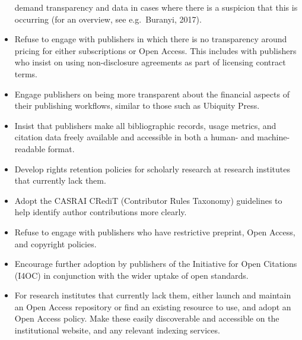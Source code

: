 \documentclass[]{article}
\begin{document}
\begin{itemize}
  demand transparency and data in cases where there is a suspicion that
  this is occurring (for an overview, see e.g.~Buranyi, 2017).
\item
  Refuse to engage with publishers in which there is no transparency
  around pricing for either subscriptions or Open Access. This includes
  with publishers who insist on using non-disclosure agreements as part
  of licensing contract terms.
\item
  Engage publishers on being more transparent about the financial
  aspects of their publishing workflows, similar to those such as
  Ubiquity Press.
\item
  Insist that publishers make all bibliographic records, usage metrics,
  and citation data freely available and accessible in both a human- and
  machine-readable format.
\item
  Develop rights retention policies for scholarly research at research
  institutes that currently lack them.
\item
  Adopt the CASRAI CRediT (Contributor Rules Taxonomy) guidelines to
  help identify author contributions more clearly.
\item
  Refuse to engage with publishers who have restrictive preprint, Open
  Access, and copyright policies.
\item
  Encourage further adoption by publishers of the Initiative for Open
  Citations (I4OC) in conjunction with the wider uptake of open
  standards.
\item
  For research institutes that currently lack them, either launch and
  maintain an Open Access repository or find an existing resource to
  use, and adopt an Open Access policy. Make these easily discoverable
  and accessible on the institutional website, and any relevant indexing
  services.


\end{itemize}
\end{document}
